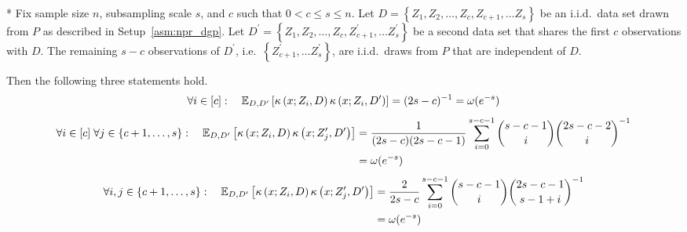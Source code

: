 \begin{lem}[]\label{lem:expec_kernel_prod}\mbox{}\\*
    Fix sample size $n$, subsampling scale $s$, and $c$ such that $0 < c \leq s \leq n$.
	Let $D = \left\{Z_1, Z_2, \dotsc, Z_c, Z_{c+1}, \dotsc Z_s \right\}$ be an i.i.d.\ data set drawn from $P$ as described in Setup~\ref{asm:npr_dgp}.
	Let $D^{\prime} = \left\{Z_1, Z_2, \dotsc, Z_c, Z_{c+1}^{\prime}, \dotsc Z_s^{\prime} \right\}$ be a second data set that shares the first $c$ observations with $D$.
	The remaining $s - c$ observations of $D^{\prime}$, i.e.\ $\left\{Z_{c+1}^{\prime}, \dotsc Z_s^{\prime} \right\}$, are i.i.d.\ draws from $P$ that are independent of $D$.

    Then the following three statements hold.
    \begin{equation}
        \forall i \in [c]: \quad
        \mathbb{E}_{D, D^{\prime}}\left[\kappa\left(x; Z_{i}, D\right)\kappa\left(x; Z_{i}, D^{\prime}\right)\right]
        = (2s - c)^{-1} = \omega(e^{-s})
    \end{equation}
    \begin{equation}
        \begin{aligned}
            \forall i \in [c] \; \forall j \in \{c+1, \dotsc, s\}: \quad
            \mathbb{E}_{D, D^{\prime}}\left[\kappa\left(x; Z_{i}, D\right)\kappa\left(x; Z_{j}^{\prime}, D^{\prime}\right)\right]
            & = \frac{1}{(2s - c)(2s-c-1)}\sum_{i = 0}^{s - c - 1}\binom{s - c - 1}{i}\binom{2s - c - 2}{i}^{-1} \\
            & = \omega(e^{-s})
        \end{aligned}
    \end{equation}
    \begin{equation}
        \begin{aligned}
            \forall i,j \in \{c+1, \dotsc, s\}: \quad
            \mathbb{E}_{D, D^{\prime}}\left[\kappa\left(x; Z_{i}, D\right)\kappa\left(x; Z_{j}^{\prime}, D^{\prime}\right)\right]
            & = \frac{2}{2s-c}\sum_{i = 0}^{s-c-1} \binom{s - c - 1}{i}\binom{2s - c - 1}{s-1+i}^{-1}\\
            & = \omega(e^{-s})
        \end{aligned}
    \end{equation}
\end{lem}

